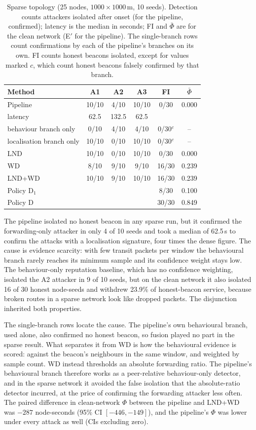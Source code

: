 \begin{table}[!t]
\caption{Sparse topology (25 nodes, $1000 \times 1000$\,m, 10 seeds).
Detection counts attackers isolated after onset (for the pipeline, confirmed);
latency is the median in seconds; FI and $\bar\Phi$ are for the clean network
(E$'$ for the pipeline). The single-branch rows count confirmations by each of
the pipeline's branches on its own. FI counts honest beacons isolated, except
for values marked $c$, which count honest beacons falsely confirmed by that
branch.}
\label{tab:sparse}
\centering
\small
\setlength{\tabcolsep}{4pt}
\begin{tabular}{@{}lccccc@{}}
\toprule
Method & A1 & A2 & A3 & FI & $\bar\Phi$ \\
\midrule
Pipeline & 10/10 & 4/10 & 10/10 & 0/30 & 0.000 \\
\quad latency & 62.5 & 132.5 & 62.5 & & \\
\quad behaviour branch only & 0/10 & 4/10 & 4/10 & 0/30$^{c}$ & -- \\
\quad localisation branch only & 10/10 & 0/10 & 10/10 & 0/30$^{c}$ & -- \\
LND & 10/10 & 0/10 & 10/10 & 0/30 & 0.000 \\
WD & 8/10 & 9/10 & 9/10 & 16/30 & 0.239 \\
LND+WD & 10/10 & 9/10 & 10/10 & 16/30 & 0.239 \\
Policy D$_1$ & & & & 8/30 & 0.100 \\
Policy D & & & & 30/30 & 0.849 \\
\bottomrule
\end{tabular}
\end{table}

The pipeline isolated no honest beacon in any sparse run, but it confirmed
the forwarding-only attacker in only 4 of 10 seeds and took a median of
62.5\,s to confirm the attacks with a localisation signature, four times the
dense figure. The cause is evidence scarcity: with few transit packets per
window the behavioural branch rarely reaches its minimum sample and its
confidence weight stays low. The behaviour-only reputation baseline, which
has no confidence weighting, isolated the A2 attacker in 9 of 10 seeds, but
on the clean network it also isolated 16 of 30 honest node-seeds and withdrew
23.9\% of honest-beacon service, because broken routes in a sparse network
look like dropped packets. The disjunction inherited both properties.

The single-branch rows locate the cause. The pipeline's own behavioural
branch, used alone, also confirmed no honest beacon, so fusion played no part
in the sparse result. What separates it from WD is how the behavioural
evidence is scored: against the beacon's neighbours in the same window, and
weighted by sample count. WD instead thresholds an absolute forwarding ratio.
The pipeline's behavioural branch therefore works as a peer-relative
behaviour-only detector, and in the sparse network it avoided the false isolation that the
absolute-ratio detector incurred, at the price of confirming the forwarding
attacker less often. The paired difference in clean-network $\Phi$ between the pipeline and LND+WD
was $-287$ node-seconds (95\% CI $[-446, -149]$), and the pipeline's $\Phi$
was lower under every attack as well (CIs excluding zero).

